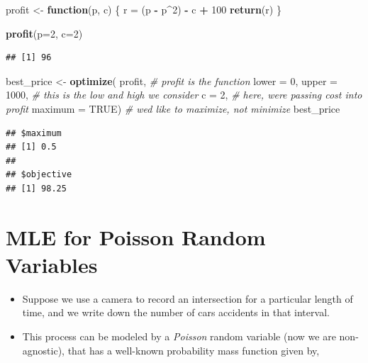 \documentclass[
]{book}
\newenvironment{Shaded}{\begin{snugshade}}{\end{snugshade}}
\newcommand{\AttributeTok}[1]{\textcolor[rgb]{0.13,0.29,0.53}{#1}}
\newcommand{\CommentTok}[1]{\textcolor[rgb]{0.56,0.35,0.01}{\textit{#1}}}
\newcommand{\ConstantTok}[1]{\textcolor[rgb]{0.56,0.35,0.01}{#1}}
\newcommand{\ControlFlowTok}[1]{\textcolor[rgb]{0.13,0.29,0.53}{\textbf{#1}}}
\newcommand{\DecValTok}[1]{\textcolor[rgb]{0.00,0.00,0.81}{#1}}
\newcommand{\FunctionTok}[1]{\textcolor[rgb]{0.13,0.29,0.53}{\textbf{#1}}}
\newcommand{\NormalTok}[1]{#1}
\newcommand{\OtherTok}[1]{\textcolor[rgb]{0.56,0.35,0.01}{#1}}
\newcommand{\SpecialCharTok}[1]{\textcolor[rgb]{0.81,0.36,0.00}{\textbf{#1}}}
\providecommand{\tightlist}{%
  \setlength{\itemsep}{0pt}\setlength{\parskip}{0pt}}
\theoremstyle{definition}
\theoremstyle{definition}
\theoremstyle{definition}
\theoremstyle{definition}
\theoremstyle{remark}
\begin{document}
\begin{Shaded}
\begin{Highlighting}[]
\NormalTok{profit }\OtherTok{\textless{}{-}} \ControlFlowTok{function}\NormalTok{(p, c) \{ }
\NormalTok{  r }\OtherTok{=}\NormalTok{ (p }\SpecialCharTok{{-}}\NormalTok{ p}\SpecialCharTok{\^{}}\DecValTok{2}\NormalTok{) }\SpecialCharTok{{-}}\NormalTok{ c }\SpecialCharTok{+} \DecValTok{100}
  \FunctionTok{return}\NormalTok{(r) }
\NormalTok{  \} }
\end{Highlighting}
\end{Shaded}

\begin{Shaded}
\begin{Highlighting}[]
\FunctionTok{profit}\NormalTok{(}\AttributeTok{p=}\DecValTok{2}\NormalTok{, }\AttributeTok{c=}\DecValTok{2}\NormalTok{)}
\end{Highlighting}
\end{Shaded}

\begin{verbatim}
## [1] 96
\end{verbatim}

\begin{Shaded}
\begin{Highlighting}[]
\NormalTok{best\_price }\OtherTok{\textless{}{-}} \FunctionTok{optimize}\NormalTok{(}
\NormalTok{  profit,                    }\CommentTok{\# profit is the function}
  \AttributeTok{lower =} \DecValTok{0}\NormalTok{, }\AttributeTok{upper =} \DecValTok{1000}\NormalTok{,   }\CommentTok{\# this is the low and high we consider}
  \AttributeTok{c =} \DecValTok{2}\NormalTok{,                     }\CommentTok{\# here, we\textquotesingle{}re passing cost into profit}
  \AttributeTok{maximum =} \ConstantTok{TRUE}\NormalTok{)            }\CommentTok{\# we\textquotesingle{}d like to maximize, not minimize}
\NormalTok{best\_price}
\end{Highlighting}
\end{Shaded}

\begin{verbatim}
## $maximum
## [1] 0.5
## 
## $objective
## [1] 98.25
\end{verbatim}

\section{MLE for Poisson Random Variables}\label{mle-for-poisson-random-variables}

\begin{itemize}
\tightlist
\item
  Suppose we use a camera to record an intersection for a particular length of time, and we write down the number of cars accidents in that interval.\\
\item
  This process can be modeled by a \emph{Poisson} random variable (now we are non-agnostic), that has a well-known probability mass function given by,
\end{itemize}
\end{document}
